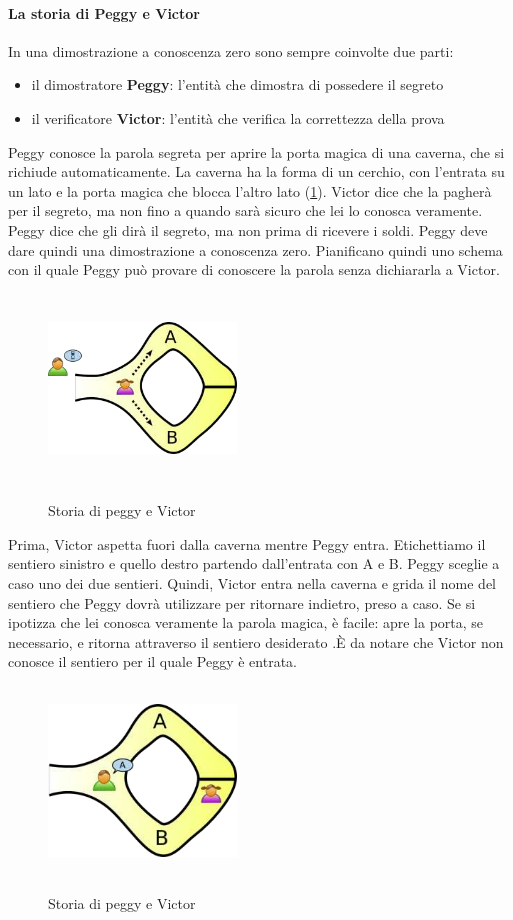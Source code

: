 \paragraph{La storia di Peggy e Victor}
In una dimostrazione a conoscenza zero sono sempre coinvolte due parti:
\begin{itemize}
\item il dimostratore \textbf{Peggy}: l'entità che dimostra di possedere il segreto
\item il verificatore \textbf{Victor}: l'entità che verifica la correttezza della prova
\end{itemize}
Peggy conosce la parola segreta per aprire la porta magica di una caverna, che si richiude automaticamente. La caverna ha la forma di un cerchio, con l'entrata su un lato e la porta magica che blocca l'altro lato (\ref{fig:peggy_victor_1}). Victor dice che la pagherà per il segreto, ma non fino a quando sarà sicuro che lei lo conosca veramente. Peggy dice che gli dirà il segreto, ma non prima di ricevere i soldi. Peggy deve dare quindi una dimostrazione a conoscenza zero. Pianificano quindi uno schema con il quale Peggy può provare di conoscere la parola senza dichiararla a Victor.
\begin{figure}[htbp]
	\centering%
	\subfigure%
	{\includegraphics[height=5cm, width=5cm, keepaspectratio]{Immagini/chiave_pubblica/peggy_victor_1.png}}
	\caption{Storia di peggy e Victor\label{fig:peggy_victor_1}}
\end{figure}
Prima, Victor aspetta fuori dalla caverna mentre Peggy entra. Etichettiamo il sentiero sinistro e quello destro partendo dall'entrata con A e B. Peggy sceglie a caso uno dei due sentieri. Quindi, Victor entra nella caverna e grida il nome del sentiero che Peggy dovrà utilizzare per ritornare indietro, preso a caso. Se si ipotizza che lei conosca veramente
la parola magica, è facile: apre la porta, se necessario, e ritorna attraverso il sentiero desiderato .È da notare che Victor non conosce il sentiero per il quale Peggy è entrata.
\begin{figure}[htbp]
	\centering%
	\subfigure%
	{\includegraphics[height=5cm, width=5cm, keepaspectratio]{Immagini/chiave_pubblica/peggy_victor_2.png}}
	\caption{Storia di peggy e Victor\label{fig:peggy_victor_2}}
\end{figure}
